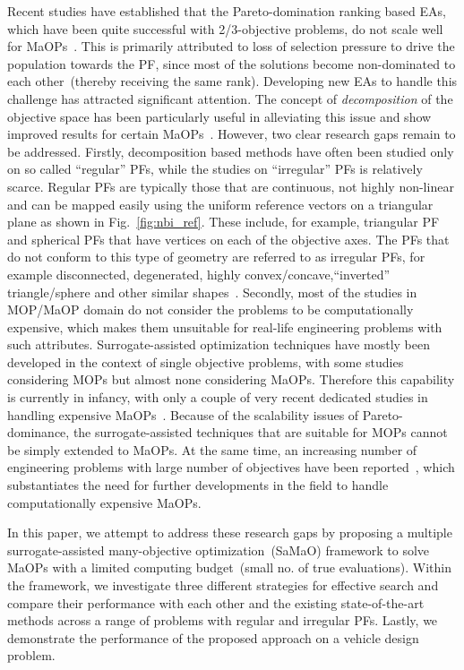 Recent studies have established that the Pareto-domination ranking based EAs, which have been quite successful with 2/3-objective problems, do not scale well for MaOPs~\cite{KHTishibuchi2008evolutionary}. This is primarily attributed to loss of selection pressure to drive the population towards the PF, since most of the solutions become non-dominated to each other~(thereby receiving the same rank). Developing new EAs to handle this challenge has attracted significant attention. {\color{blue}The concept of \textit{decomposition} of the objective space} has been particularly useful in alleviating this issue and show improved results for certain MaOPs~\cite{KHTtrivedisurvey}. However, two clear research gaps remain to be addressed. Firstly, decomposition based methods have often been studied only on so called {\color{blue} ``regular'' PFs, while the studies on ``irregular'' PFs is relatively scarce\cite{KHTishibuchi2016inverse}. Regular PFs are typically those that are continuous, not highly non-linear and can be mapped easily using the uniform reference vectors on a triangular plane as shown in Fig.~\ref{fig:nbi_ref}. These include, for example, triangular PF and spherical PFs that have vertices on each of the objective axes. The PFs that do not conform to this type of geometry are referred to as irregular PFs, for example  disconnected, degenerated, highly convex/concave,``inverted'' triangle/sphere and other similar shapes~\cite{asaf2017enhanced}}. Secondly, most of the studies in MOP/MaOP domain do not consider the problems to be computationally expensive, which makes them unsuitable for real-life engineering problems with such attributes. Surrogate-assisted optimization techniques have mostly been developed in the context of single objective problems, with some studies considering MOPs but almost none considering MaOPs. Therefore this capability is currently in infancy, with only a couple of very recent dedicated studies in handling expensive MaOPs~\cite{KHTchugh2016krvea,KHTchugh2016const}. Because of the scalability issues of Pareto-dominance, the surrogate-assisted techniques that are suitable for MOPs cannot be simply extended to MaOPs. At the same time, an increasing number of engineering problems with large number of objectives have been reported~\cite{KHTjmd2017,Asafuddoula2015}, which substantiates the need for further developments in the field to handle computationally expensive MaOPs.  

In this paper, we attempt to address these research gaps by proposing a multiple surrogate-assisted many-objective optimization~(SaMaO) framework to solve MaOPs with a limited computing budget~(small no. of true evaluations). Within the framework, we investigate three different strategies for effective search and compare their performance with each other and the existing state-of-the-art methods across a range of problems with regular and irregular PFs. Lastly, we demonstrate the performance of the proposed approach on a {\color{blue}vehicle design} problem. 

